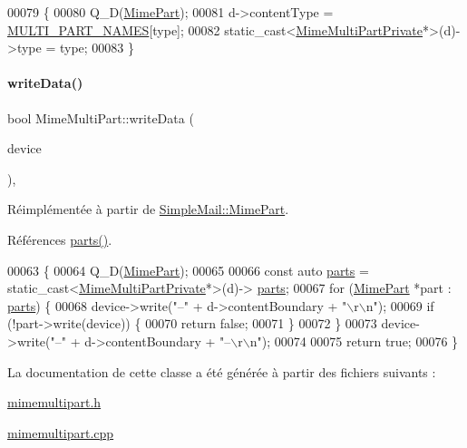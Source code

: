 \begin{DoxyCode}
00079 \{
00080     Q\_D(\hyperlink{class_simple_mail_1_1_mime_part}{MimePart});
00081     d->contentType = \hyperlink{mimemultipart_8cpp_aa142910ed0cce7101d8d240227ae592d}{MULTI\_PART\_NAMES}[type];
00082     \textcolor{keyword}{static\_cast<}\hyperlink{class_simple_mail_1_1_mime_multi_part_private}{MimeMultiPartPrivate}*\textcolor{keyword}{>}(d)->type = type;
00083 \}
\end{DoxyCode}
\mbox{\label{class_simple_mail_1_1_mime_multi_part_acbd14f495f45d946eaf779d680bd7ce1}} 
\paragraph{\texorpdfstring{write\+Data()}{writeData()}}
{\footnotesize\ttfamily bool Mime\+Multi\+Part\+::write\+Data (\begin{DoxyParamCaption}\item[{Q\+I\+O\+Device $\ast$}]{device }\end{DoxyParamCaption})\hspace{0.3cm}{\ttfamily [protected]}, {\ttfamily [virtual]}}



Réimplémentée à partir de \hyperlink{class_simple_mail_1_1_mime_part_ab8b85a3cf47e6bd8d2051dfa5c56c36a}{Simple\+Mail\+::\+Mime\+Part}.



Références \hyperlink{class_simple_mail_1_1_mime_multi_part_afdfbaaa95c2cd5aa38c0078f1e6e6a38}{parts()}.


\begin{DoxyCode}
00063 \{
00064     Q\_D(\hyperlink{class_simple_mail_1_1_mime_part}{MimePart});
00065 
00066     \textcolor{keyword}{const} \textcolor{keyword}{auto} \hyperlink{class_simple_mail_1_1_mime_multi_part_afdfbaaa95c2cd5aa38c0078f1e6e6a38}{parts} = \textcolor{keyword}{static\_cast<}\hyperlink{class_simple_mail_1_1_mime_multi_part_private}{MimeMultiPartPrivate}*\textcolor{keyword}{>}(d)->
      \hyperlink{class_simple_mail_1_1_mime_multi_part_afdfbaaa95c2cd5aa38c0078f1e6e6a38}{parts};
00067     \textcolor{keywordflow}{for} (\hyperlink{class_simple_mail_1_1_mime_part}{MimePart} *part : \hyperlink{class_simple_mail_1_1_mime_multi_part_afdfbaaa95c2cd5aa38c0078f1e6e6a38}{parts}) \{
00068         device->write(\textcolor{stringliteral}{"--"} + d->contentBoundary + \textcolor{stringliteral}{"\(\backslash\)r\(\backslash\)n"});
00069         \textcolor{keywordflow}{if} (!part->write(device)) \{
00070             \textcolor{keywordflow}{return} \textcolor{keyword}{false};
00071         \}
00072     \}
00073     device->write(\textcolor{stringliteral}{"--"} + d->contentBoundary + \textcolor{stringliteral}{"--\(\backslash\)r\(\backslash\)n"});
00074 
00075     \textcolor{keywordflow}{return} \textcolor{keyword}{true};
00076 \}
\end{DoxyCode}


La documentation de cette classe a été générée à partir des fichiers suivants \+:\begin{DoxyCompactItemize}
\item 
\hyperlink{mimemultipart_8h}{mimemultipart.\+h}\item 
\hyperlink{mimemultipart_8cpp}{mimemultipart.\+cpp}\end{DoxyCompactItemize}
